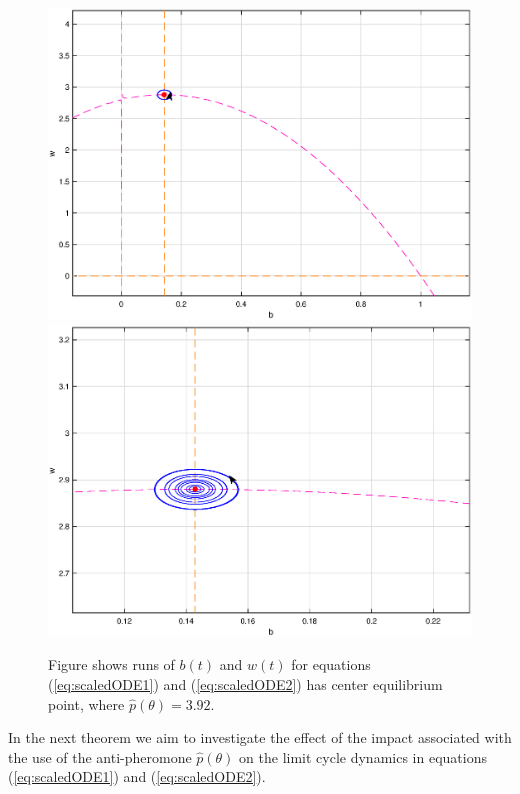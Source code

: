 \documentclass[12pt]{article}
\begin{document}
\begin{figure}[!htp]
\begin{center}
\includegraphics[scale=0.28]{img/l1.eps}  
\includegraphics[scale=0.28]{img/l2.eps}

\end{center}

\caption{Figure shows runs of $b(t)$ and $w(t)$ for equations
  (\ref{eq:scaledODE1}) and (\ref{eq:scaledODE2}) has center
  equilibrium point, where $\hat{p}(\theta )=3.92$. }
      \label{fig:l1l2}
\end{figure}

In the next theorem we aim to investigate the effect of the impact
associated with the use of the anti-pheromone $\hat{p}(\theta )$ on
the limit cycle dynamics in equations (\ref{eq:scaledODE1}) and
(\ref{eq:scaledODE2}).
\end{document}
